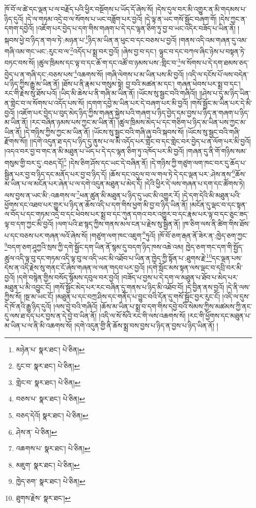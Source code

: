 ཁོ་བོ་ལ་ཚེ་དང་ལྡན་པ་ལ་བརྗོད་པའི་ཕྱིར་བསྔོགས་པ་ཡོད་དོ་ཞེས་སོ། །དེས་དུལ་བར་མི་འགྱུར་ན་མི་གདམས་པ་ཉིད་དུའོ། །དེ་ལ་གཏམ་འདྲེ་བ་ལ་སོགས་པ་ཡང་བཟློག་པར་བྱའོ། །དེ་ལྟ་ན་ཡང་གསོ་སྦྱོང་བཞག་གོ། །དེས་ཀྱང་ན་དགག་དབྱེའོ། །འཇོག་པར་བྱེད་པ་དག་གིས་གཞག་པ་དེ་དང་ལྷན་ཅིག་ཏུ་བྱ་བ་ཡང་འདིར་བཟོད་པ་ཡིན་ནོ། །སྐབས་ཕྱེ་བ་ཉིད་ན་གལ་ཏེ་:མཉན་པ་\footnote{མཉེན་པ་  སྣར་ཐང་།  པེ་ཅིན། }ཉིད་མ་ཡིན་ན་ཕུང་བ་དང་བཅས་པ་བྱའོ། །གནས་འདི་འམ་གཞན་དུ་འམ་གཞི་འམ་གང་ཡང་:རུང་བ་ལ་\footnote{རུང་བ་  སྣར་ཐང་།  པེ་ཅིན། }འདོད་པ་སྨྲ་བར་བྱའོ། །ཞེས་བྱ་བ་དང་། ལྟུང་བ་དང་བཀལ་ཞིང་ཉེས་པ་བསྟན་ཏེ་བཏང་བས་སོ། །ཚུལ་ཁྲིམས་དང་ལྟ་བ་དང་ཆོ་ག་དང་འཚོ་བ་ཉམས་པས་:གླིང་བ་\footnote{གླེང་བ་  སྣར་ཐང་།  པེ་ཅིན། }ལ་སོགས་པ་དེ་དག་ཐམས་ཅད་བྱེད་པ་ན་གཞི་དང་:བཅས་པས་\footnote{བཅས་པ་  སྣར་ཐང་།  པེ་ཅིན། }འཆགས་སོ། །གཞི་ལེགས་པ་མ་ཡིན་པས་མི་བྱའོ། །འདི་ལ་དངོས་པོ་ལས་བདེན་པ་ཉིད་ཀྱིས་རྒྱུ་མ་ཡིན་ནོ། །ཐོས་པ་ནི་རྣམ་པ་གསུམ་སྟེ། བྱ་བའི་མཚན་མ་དང་། གཞན་ཕེབས་པར་སྨྲ་བ་དང་། རང་གི་རྗེས་སུ་ཐོས་པའོ། །ཡིད་མི་ཆེས་པ་ནི་གཞི་མ་ཡིན་ནོ། །ཡོངས་སུ་སྦྱང་བའི་གཞིའོ།། །།ཤེས་པ་དུ་མ་ཉིད་ཡིན་ན་གླེང་བ་ལ་སོགས་པ་འདོད་པས་སོ། །དགག་དབྱེ་མ་ཡིན་པར་དེ་བཞག་པར་མི་བྱའོ། །གསོ་སྦྱོང་མ་ཡིན་པར་དེ་མི་བྱའོ། །འཇོག་པར་བྱེད་པ་བུད་མེད་ཉིད་ཀྱིས་གཞན་སྐྱེས་པའི་གཞག་པ་ཉིད་བྱེད་དམ་བྱས་པ་ཉིད་ན་གཞག་པ་ཉིད་མ་ཡིན་ནོ། །རང་བཞིན་ཉམས་པས་ཀྱང་མ་ཡིན་ནོ། །ཚུལ་ཁྲིམས་མེད་པ་དང་གཅིག་པ་ཉིད་མ་ཡིན་པས་ཀྱང་མ་ཡིན་ནོ། །དེ་གཉིས་ཀྱིས་ཀྱང་མ་ཡིན་ནོ། །ཡོངས་སུ་སྦྱང་བའི་གཞི་ཞུ་བའི་སྐབས་སོ། །ཡོངས་སུ་སྦྱང་བའི་གཞི་རྫོགས་སོ།། །།དགེ་འདུན་ཐ་དད་པ་ཉིད་དུ་ནུས་པ་ལ་མི་འདོད་པར་གླེང་བ་དང་གླེང་བར་བྱེད་པ་ན་ལོག་པར་མི་བྱའོ། །འདའ་བར་བྱ་བ་གང་ན་མི་མཐུན་པ་ཡོད་པ་དེ་དང་ལྷན་ཅིག་ཏུ་འཁོད་པར་མི་བྱའོ། །གཞན་དུ་ནི་གོ་གཉིས་སམ་གསུམ་གྱི་བར་དུ་:བཅད་དོ།\footnote{བཅད་དེའོ།  སྣར་ཐང་།  པེ་ཅིན། } །དེས་ཅིག་ཤོས་དང་ཡང་དེ་བཞིན་ནོ། །དེ་གཉིས་ཀྱི་གཙུག་ལག་ཁང་བར་དུ་ཆོད་པ་སྦྱིན་པར་བྱ་བ་ཉིད་དང་མནོད་པར་བྱ་བ་ཉིད་དོ། །ཆོས་དང་འདུལ་བ་ལ་གལ་ཏེ་དེ་དང་ལྡན་པར་:ཤེས་ནས་\footnote{ཤེས་ན་  པེ་ཅིན། }ཆོས་མ་ཡིན་པ་ལ་མངོན་པར་ཞེན་པ་ལ་དགེ་འདུན་མཐུན་པ་མེད་དོ། །དེའི་ཕྱིར་དེ་ལས་གཞན་པ་དག་དང་ཚོགས་ཏེ། ལས་བྱས་ན་ཡང་མི་:འཆགས་ལ་\footnote{འཆགས་པ་  སྣར་ཐང་།  པེ་ཅིན། }ཕན་ཚུན་མི་མཐུན་པ་ཉིད་དུ་ཡང་མི་འགྱུར་རོ། །དེ་དག་དེའི་མི་མཐུན་པའི་ཕྱོགས་དང་འཐབ་པར་གྱུར་པ་ཉིད་ན་ཆོས་འདི་པ་དག་གིས་ཕྱག་མི་བྱ་བ་ཉིད་ཡིན་ནོ། །མངོན་དུ་ལྡང་བ་དང་སྟན་ལ་བོད་པ་དང་གཏམ་འདྲེ་བ་དང་ཕེབས་པར་སྨྲ་བ་དང་ཀུན་དགའ་བར་འགྱུར་བ་དང་རྣམ་པར་ལྟ་བ་དང་ཅུང་ཟད་ལྟ་བ་དག་ཀྱང་མི་བྱའོ། །ལག་པའི་ཐ་སྙད་ཀྱིས་གནས་མལ་ངན་པ་རྗེས་སུ་སྦྱིན་ནོ། །ཁ་ཅིག་ལས་ནི་ཚིག་གིས་ཐོས་པ་དང་བཅས་པར་གཞན་ལའོ་ཞེས་སོ། །གཙུག་ལག་ཁང་འཇུག་\footnote{མཇུག་  སྣར་ཐང་།  པེ་ཅིན། }ཏུའོ། །ཁོ་བོ་ཅག་རྒན་ནོ་ཟེར་ན་:ཁྱེད་ཅག་ཀྱང་\footnote{ཁྱེད་ཅག་  སྣར་ཐང་།  པེ་ཅིན། }བདག་ཅག་ཤཱཀྱའི་སྲས་ཀྱི་དགེ་སྦྱོང་དག་ཡིན་ནོ་སྙམ་དུ་བདག་ཉིད་ཁས་འཆེ་འམ། ཁྱེད་ཅག་གང་དག་གི་སྤྱོད་ཚུལ་འདི་ལྟ་བུ་དང་གཏམ་འདི་ལྟ་བུ་ལ་འདི་ཡང་མི་འཐོབ་པ་ཡིན་ན་ཁྱེད་ཀྱི་སྟོན་པ་:ཐུགས་རྗེ་\footnote{ཐུགས་རྗེས་  སྣར་ཐང་། }དང་ལྡན་པས་དེས་ན་འདི་རྗེས་སུ་གནང་ངོ་ཞེས་གཞན་ལ་ལན་གདབ་པར་བྱའོ། །དགེ་སློང་མས་སྟན་ལས་ལྡང་བ་དབྲི་བར་མི་བྱའོ། །དགེ་བསྙེན་གྱིས་བསོད་སྙོམས་དབུལ་བར་བྱའོ། །བཟོད་པ་བྱས་པ་དེ་དག་ལ་མཐུན་པ་ཐོབ་པ་མེད་པར་མཐུན་པ་མི་འབྱུང་ངོ། །གསོ་སྦྱོང་མེད་པར་རང་བཞིན་དུ་གནས་པ་ཉིད་མི་འཐོབ་བོ། །དེ་བྱིན་ནས་བྱའོ། །དེ་ནི་ལས་ཀྱིས་སོ། །སྔ་མ་ཡང་ངོ། །མཐུན་པ་དང་བཀྲ་ཤིས་དང་གནོད་པ་བྱུང་བའི་དོན་དུ་གསོ་སྦྱོང་བྱར་རུང་ངོ། །འདི་ལ་དུས་དེ་ཁོ་ནའི་རྒྱུ་ཉིད་དུའོ། །ལས་བྱེ་བའི་གཞིའོ། །ཆོས་མ་ཡིན་པ་སྨྲ་བ་དག་གིས་དབྱེ་བའི་སེམས་ཀྱིས་མཚམས་ཀྱི་ནང་དུ་ལས་ཐ་དད་པར་བྱས་ན་དེ་བྱེ་བ་ཡིན་ནོ། །འདི་ལ་སོ་སོའི་རང་གི་ལས་འཆགས་སོ། །རང་གི་ཕྱོགས་དང་མཐུན་པ་མ་ཡིན་པ་ལ་ནི་མི་འཆགས་སོ། །དགེ་འདུན་གྱི་ནི་ཆོས་སྨྲ་བས་བྱས་པ་ཉིད་ན་བྱས་པ་ཉིད་ཡིན་ནོ། །
